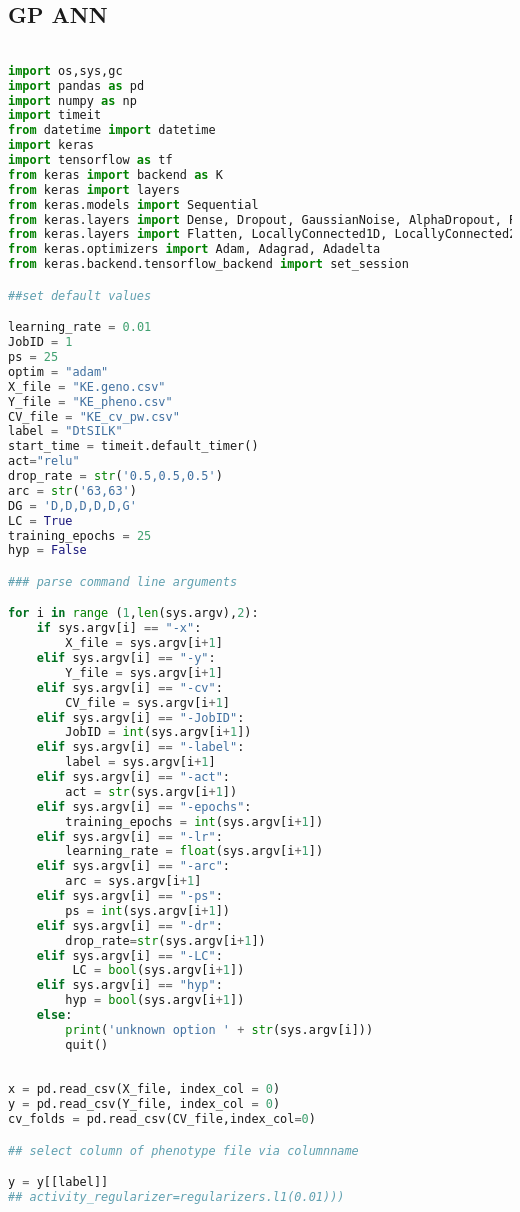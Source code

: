 \subsection{GP ANN}
\begin{lstlisting}[language=Python]

import os,sys,gc
import pandas as pd
import numpy as np
import timeit
from datetime import datetime
import keras
import tensorflow as tf
from keras import backend as K
from keras import layers
from keras.models import Sequential
from keras.layers import Dense, Dropout, GaussianNoise, AlphaDropout, Reshape
from keras.layers import Flatten, LocallyConnected1D, LocallyConnected2D
from keras.optimizers import Adam, Adagrad, Adadelta
from keras.backend.tensorflow_backend import set_session 

##set default values

learning_rate = 0.01
JobID = 1
ps = 25
optim = "adam"
X_file = "KE.geno.csv"
Y_file = "KE_pheno.csv"
CV_file = "KE_cv_pw.csv"
label = "DtSILK"
start_time = timeit.default_timer()
act="relu"
drop_rate = str('0.5,0.5,0.5')
arc = str('63,63')
DG = 'D,D,D,D,D,G'
LC = True
training_epochs = 25
hyp = False

### parse command line arguments

for i in range (1,len(sys.argv),2):
    if sys.argv[i] == "-x":
        X_file = sys.argv[i+1]
    elif sys.argv[i] == "-y":
        Y_file = sys.argv[i+1]
    elif sys.argv[i] == "-cv":
        CV_file = sys.argv[i+1]
    elif sys.argv[i] == "-JobID":
        JobID = int(sys.argv[i+1])
    elif sys.argv[i] == "-label":
        label = sys.argv[i+1]
    elif sys.argv[i] == "-act":
        act = str(sys.argv[i+1])
    elif sys.argv[i] == "-epochs":
        training_epochs = int(sys.argv[i+1])
    elif sys.argv[i] == "-lr":
        learning_rate = float(sys.argv[i+1])
    elif sys.argv[i] == "-arc":
        arc = sys.argv[i+1]
    elif sys.argv[i] == "-ps":
        ps = int(sys.argv[i+1])
    elif sys.argv[i] == "-dr":
        drop_rate=str(sys.argv[i+1])
    elif sys.argv[i] == "-LC":
         LC = bool(sys.argv[i+1])
    elif sys.argv[i] == "hyp":
        hyp = bool(sys.argv[i+1])
    else:
        print('unknown option ' + str(sys.argv[i]))
        quit()
       
        
x = pd.read_csv(X_file, index_col = 0)
y = pd.read_csv(Y_file, index_col = 0)
cv_folds = pd.read_csv(CV_file,index_col=0)

## select column of phenotype file via columnname

y = y[[label]]
## activity_regularizer=regularizers.l1(0.01)))


\end{lstlisting}
